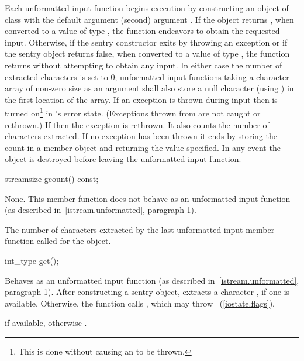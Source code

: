 \pnum
Each unformatted input function begins execution by constructing an object of class
with the default argument
(second) argument
.
If the
object returns
,
when converted to a value of type
,
the function endeavors
to obtain the requested input.
Otherwise, if the sentry constructor exits by throwing an exception or if
the sentry object returns false, when converted to a value of type
,
the function returns without attempting to obtain any input.
In either case the number of extracted characters is set to 0;
unformatted input functions taking a character array of non-zero size as
an argument shall also store a null character (using
)
in the first location of the array.
If an exception is thrown during input then
is turned on\footnote{This is done without causing an
to be thrown.}
in
's
error state.
(Exceptions thrown from
are not caught or rethrown.)
If
then the exception is rethrown.
It also counts the number of characters extracted.
If no exception has been thrown it ends
by storing the count in a member object
and returning the value specified.
In any event the
object
is destroyed before leaving the unformatted input function.

%
\begin{itemdecl}
streamsize gcount() const;
\end{itemdecl}

\begin{itemdescr}
\pnum
\effects
None.
This member function does not behave as an unformatted
input function (as described in~\ref{istream.unformatted}, paragraph 1).

\pnum
\returns
The number of characters
extracted by the last unformatted input member function called for the object.
\end{itemdescr}

%
\begin{itemdecl}
int_type get();
\end{itemdecl}

\begin{itemdescr}
\pnum
\effects
Behaves as an unformatted input function
(as described in~\ref{istream.unformatted}, paragraph 1).
After constructing a sentry object, extracts
a character , if one is available.
Otherwise, the function calls
,
which may throw
~(\ref{iostate.flags}),

\pnum
\returns
{} if available,
otherwise
.
\end{itemdescr}


